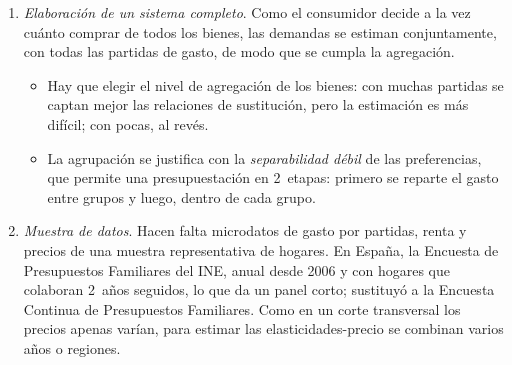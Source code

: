 \documentclass[11pt]{article}
\begin{document}
\begin{enumerate}
\begin{itemize}
  \item {}: aproximaciones de segundo orden a una función cualquiera, que no imponen las elasticidades. La \emph{translog} de \textcite{ChristensenJorgensonLau1975Utility} es un desarrollo de segundo orden en logaritmos (de la utilidad directa o de la indirecta), muy flexible, pero genera sistemas no lineales difíciles de estimar.
  \item {} (AIDS) de \textcite{DeatonMuellbauer1980AIDS}, que parte de preferencias PIGLOG. Las participaciones en el gasto son lineales en los logaritmos de los precios y de la renta real,
    \begin{equation*}
    s_i=\alpha_i+\sum_j\gamma_{ij}\ln p_j+\beta_i\ln\frac{\overline{W}}{P},
    \end{equation*}
    donde $P$ es un índice de precios. Tiene 4~ventajas:
    \begin{itemize}
    \item es flexible;
    \item se estima casi por mínimos cuadrados (con el índice de , de forma lineal);
    \item la homogeneidad ($\sum_j\gamma_{ij}=0$) y la simetría ($\gamma_{ij}=\gamma_{ji}$) son restricciones lineales fáciles de contrastar;
    \item por ser PIGLOG, se agrega de forma exacta\nocite{Muellbauer1975Aggregation,Muellbauer1976Community} (apartado~\ref{sec:solucion-problema-maximizacion}).
    \end{itemize}
  \end{itemize}
\item \emph{Elaboración de un sistema completo}. Como el consumidor decide a la vez cuánto comprar de todos los bienes, las demandas se estiman conjuntamente, con todas las partidas de gasto, de modo que se cumpla la agregación.
  \begin{itemize}
  \item Hay que elegir el nivel de agregación de los bienes: con muchas partidas se captan mejor las relaciones de sustitución, pero la estimación es más difícil; con pocas, al revés.
  \item La agrupación se justifica con la \emph{separabilidad débil} de las preferencias, que permite una presupuestación en 2~etapas: primero se reparte el gasto entre grupos y luego, dentro de cada grupo\nocite{DeatonMuellbauer1980Economics}.
  \end{itemize}
\item \emph{Muestra de datos}. Hacen falta microdatos de gasto por partidas, renta y precios de una muestra representativa de hogares. En España, la Encuesta de Presupuestos Familiares del INE, anual desde 2006 y con hogares que colaboran 2~años seguidos, lo que da un panel corto; sustituyó a la Encuesta Continua de Presupuestos Familiares\nocite{INE2008EPFCaracteristicas,INEEPFMetodologia}. Como en un corte transversal los precios apenas varían, para estimar las elasticidades-precio se combinan varios años o regiones.

\end{enumerate}
\end{document}
